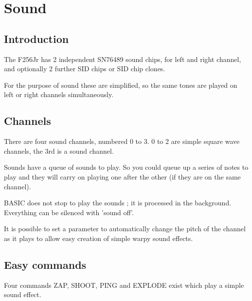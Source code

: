 \chapter{Sound}

\section{Introduction}

The F256Jr has 2 independent SN76489 sound chips, for left and right channel, and optionally 2 further SID chips or SID chip clones.

For the purpose of sound these are simplified, so the same tones are played on left or right channels simultaneously.

\section{Channels}

There are four sound channels, numbered 0 to 3. 0 to 2 are simple square wave channels, the 3rd is a sound channel.

Sounds have a queue of sounds to play. So you could queue up a series of notes to play and they will carry on playing one after the other (if they are on the same channel). 

BASIC does not stop to play the sounds ; it is processed in the background. Everything can be silenced with 'sound off'.

It is possible to set a parameter to automatically change the pitch of the channel as it plays to allow easy creation of simple warpy sound effects.

\section{Easy commands}

Four commands ZAP, SHOOT, PING and EXPLODE exist which play a simple sound effect.




